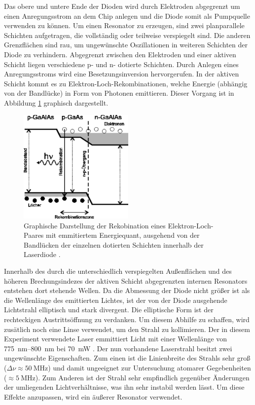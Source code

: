 Das obere und untere Ende der Dioden wird durch Elektroden abgegrenzt um einen
Anregungsstrom an dem Chip anlegen und die Diode somit als Pumpquelle verwenden zu
können. Um einen Resonator zu erzeugen, sind zwei planparallele Schichten
aufgetragen, die vollständig oder teilweise verspiegelt sind. Die anderen
Grenzflächen sind rau, um ungewünschte Oszillationen in weiteren Schichten der
Diode zu verhindern. Abgegrenzt zwischen den Elektroden und einer aktiven Schicht
liegen verschiedene p- und n- dotierte Schichten. Durch Anlegen eines
Anregungsstroms wird eine Besetzungsinversion hervorgerufen. In der aktiven
Schicht kommt es zu Elektron-Loch-Rekombinationen, welche Energie (abhängig von der
Bandlücke) in Form von Photonen emittieren. Dieser Vorgang ist in Abbildung
\ref{fig:recombition} graphisch dargestellt.
\begin{figure}[htb]
  \centering
  \includegraphics[width=0.5\textwidth]{images/recombition.pdf}
  \caption{Graphische Darstellung der Rekobination eines Elektron-Loch-Paares mit
  emmitiertem Energiequant, ausgehend von der Bandlücken der einzelnen dotierten
  Schichten innerhalb der Laserdiode \cite{recomb}.}
  \label{fig:recombition}
\end{figure}
Innerhalb des durch die unterschiedlich
verspiegelten Außenflächen und des höheren Brechungsindezes der aktiven Schicht
abgegrenzten internen Resonators entstehen dort stehende Wellen. Da die Abmessung
der Diode nicht größer ist als die Wellenlänge des emittierten Lichtes, ist der
von der Diode ausgehende Lichtstrahl elliptisch und stark divergent. Die elliptische
Form ist der rechteckigen Austrittsöffnung zu verdanken. Um diesem
Abhilfe zu schaffen, wird zusätlich noch eine Linse verwendet, um den Strahl zu
kollimieren.
Der in diesem Experiment verwendete Laser emmittiert Licht
mit einer Wellenlänge von \SIrange{775}{800}{\nano\meter} bei \SI{70}{\milli\watt}
\cite{Sanyo}.
Der nun vorhandene Laserstrahl besitzt zwei ungewünschte Eigenschaften. Zum einen
ist die Linienbreite des Strahls sehr groß ($\Delta\nu \approx \SI{50}{\mega\hertz}$)
und damit ungeeignet zur Untersuchung atomarer Gegebenheiten ($ \approx \SI{5}{\mega\hertz}$).
Zum Anderen ist der Strahl sehr empfindlich gegenüber Änderungen der umliegenden
Lichtverhältnisse,
was ihn sehr instabil werden lässt. Um diese Effekte anzupassen, wird ein äußerer
Resonator verwendet.

